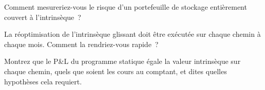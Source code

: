 \begin{interviewq}\label{iq:s2:storage-transport-and-physical-optionality:4}
Comment mesureriez-vous le risque d'un portefeuille de stockage entièrement couvert à l'intrinsèque~?
\end{interviewq}

\begin{interviewq}\label{iq:s2:storage-transport-and-physical-optionality:5}
La réoptimisation de l'intrinsèque glissant doit être exécutée sur chaque chemin à chaque mois. Comment la rendriez-vous rapide~?
\end{interviewq}

\begin{interviewq}\label{iq:s2:storage-transport-and-physical-optionality:6}
Montrez que le P\&L du programme statique égale la valeur intrinsèque sur chaque chemin, quels que soient les cours au comptant, et dites quelles hypothèses cela requiert.
\end{interviewq}
